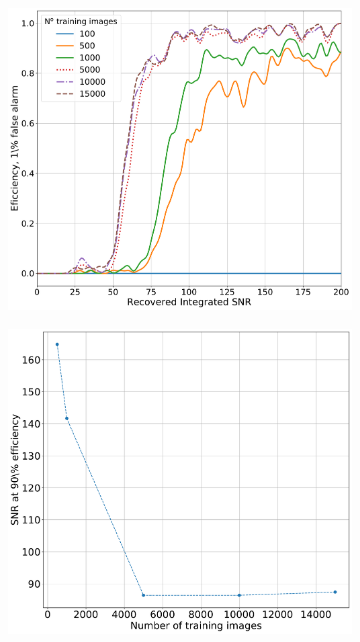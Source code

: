 \begin{figure}[h]
	\begin{subfigure}[h]{0.5\textwidth}
		\includegraphics[width=\linewidth]{C4_cnn/o1_sens_with_trainnum_eff.pdf}
		\label{machine:cnn:sens_size:o1_sens:eff}
		\caption{}
	\end{subfigure}
	\begin{subfigure}[h]{0.5\textwidth}
		\includegraphics[width=\linewidth]{C4_cnn/o1_sens_with_trainnum.pdf}

\end{subfigure}
\end{figure}
